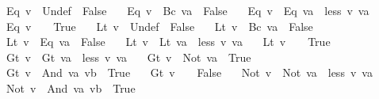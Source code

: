 \begin{isabellebody}
\isanewline
\ \ {\isachardoublequoteopen}{\isacharparenleft}Eq\ v\ {\isacharless}\ Undef{\isacharparenright}\ {\isacharequal}\ False{\isachardoublequoteclose}\ {\isacharbar}\isanewline
\ \ {\isachardoublequoteopen}{\isacharparenleft}Eq\ v\ {\isacharless}\ Bc\ va{\isacharparenright}\ {\isacharequal}\ False{\isachardoublequoteclose}\ {\isacharbar}\isanewline
\ \ {\isachardoublequoteopen}{\isacharparenleft}Eq\ v\ {\isacharless}\ Eq\ va{\isacharparenright}\ {\isacharequal}\ less\ v\ va{\isachardoublequoteclose}\ {\isacharbar}\isanewline
\ \ {\isachardoublequoteopen}{\isacharparenleft}Eq\ v\ {\isacharless}\ {\isacharunderscore}{\isacharparenright}\ {\isacharequal}\ True{\isachardoublequoteclose}\ {\isacharbar}\isanewline
\isanewline
\ \ {\isachardoublequoteopen}{\isacharparenleft}Lt\ v\ {\isacharless}\ Undef{\isacharparenright}\ {\isacharequal}\ False{\isachardoublequoteclose}\ {\isacharbar}\isanewline
\ \ {\isachardoublequoteopen}{\isacharparenleft}Lt\ v\ {\isacharless}\ Bc\ va{\isacharparenright}\ {\isacharequal}\ False{\isachardoublequoteclose}\ {\isacharbar}\isanewline
\ \ {\isachardoublequoteopen}{\isacharparenleft}Lt\ v\ {\isacharless}\ Eq\ va{\isacharparenright}\ {\isacharequal}\ False{\isachardoublequoteclose}\ {\isacharbar}\isanewline
\ \ {\isachardoublequoteopen}{\isacharparenleft}Lt\ v\ {\isacharless}\ Lt\ va{\isacharparenright}\ {\isacharequal}\ less\ v\ va{\isachardoublequoteclose}\ {\isacharbar}\isanewline
\ \ {\isachardoublequoteopen}{\isacharparenleft}Lt\ v\ {\isacharless}\ {\isacharunderscore}{\isacharparenright}\ {\isacharequal}\ True{\isachardoublequoteclose}\ {\isacharbar}\isanewline
\isanewline
\ \ {\isachardoublequoteopen}{\isacharparenleft}Gt\ v\ {\isacharless}\ Gt\ va{\isacharparenright}\ {\isacharequal}\ less\ v\ va{\isachardoublequoteclose}\ {\isacharbar}\isanewline
\ \ {\isachardoublequoteopen}{\isacharparenleft}Gt\ v\ {\isacharless}\ Not\ va{\isacharparenright}\ {\isacharequal}\ True{\isachardoublequoteclose}\ {\isacharbar}\isanewline
\ \ {\isachardoublequoteopen}{\isacharparenleft}Gt\ v\ {\isacharless}\ And\ va\ vb{\isacharparenright}\ {\isacharequal}\ True{\isachardoublequoteclose}\ {\isacharbar}\isanewline
\ \ {\isachardoublequoteopen}{\isacharparenleft}Gt\ v\ {\isacharless}\ {\isacharunderscore}{\isacharparenright}\ {\isacharequal}\ False{\isachardoublequoteclose}\ {\isacharbar}\isanewline
\isanewline
\ \ {\isachardoublequoteopen}{\isacharparenleft}Not\ v\ {\isacharless}\ Not\ va{\isacharparenright}\ {\isacharequal}\ less\ v\ va{\isachardoublequoteclose}\ {\isacharbar}\isanewline
\ \ {\isachardoublequoteopen}{\isacharparenleft}Not\ v\ {\isacharless}\ And\ va\ vb{\isacharparenright}\ {\isacharequal}\ True{\isachardoublequoteclose}\ {\isacharbar}\isanewline

\end{isabellebody}
